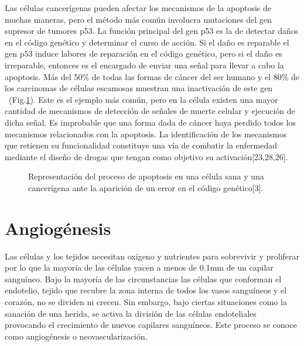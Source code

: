 \hspace{.1cm}Las células cancerígenas pueden afectar los mecanismos de la apoptosis de muchas maneras, pero el método más común involucra mutaciones del gen supresor de tumores p53. La función principal del gen p53 es la de detectar daños en el código genético y determinar el curso de acción. Si el daño es reparable el gen p53 induce labores de reparación en el código genético, pero si el daño es irreparable, entonces es el encargado de enviar una señal para llevar a cabo la apoptosis. Más del 50\% de todas las formas de cáncer del ser humano y el 80\% de los carcinomas de células escamosas muestran una inactivación de este gen ~(Fig.\ref{fig-apoptosis}). Este es el ejemplo más común, pero en la célula existen una mayor cantidad de mecanismos de detección de señales de muerte celular y ejecución de dicha señal. Es improbable que una forma dada de cáncer haya perdido todos los mecanismos relacionados con la apoptosis. La identificación de los mecanismos que retienen su funcionalidad constituye una vía de combatir la enfermedad mediante el diseño de drogas que tengan como objetivo su activación[23,28,26].

\begin{figure}[!ht]
\begin{center}
\end{center}\vspace*{-0.6cm}
\caption[Representaci\'on del proceso de apoptosis en una c\'elula sana y una cancer\'igena ante la aparici\'on de un error en el c\'odigo gen\'etico]{Representaci\'on del proceso de apoptosis en una c\'elula sana y una cancer\'igena ante la aparici\'on de un error en el c\'odigo gen\'etico[3].}
\label{fig-apoptosis}
\end{figure}

\section{Angiogénesis}
\hspace{.1cm}Las células y los tejidos necesitan oxígeno y nutrientes para sobrevivir y proliferar por lo que la mayoría de las células yacen a menos de 0.1mm de un capilar sanguíneo. Bajo la mayoría de las circunstancias las células que conforman el endotelio, tejido que recubre la zona interna de todos los vasos sanguíneos y el corazón, no se dividen ni crecen. Sin embargo, bajo ciertas situaciones como la sanación de una herida, se activa la división de las células endoteliales provocando el crecimiento de nuevos capilares sanguíneos. Este proceso se conoce como angiogénesis o neovascularización.

